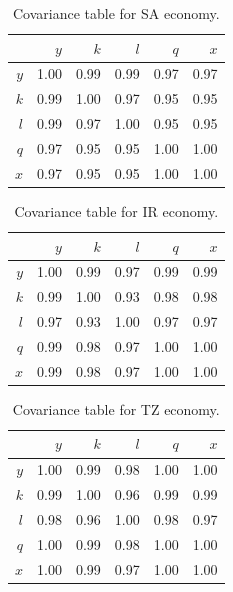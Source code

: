 \documentclass[preprint,authoryear,12pt]{elsarticle}\usepackage{graphicx, color}
\begin{document}
\begin{table}[H]
\begin{center}
\caption{Covariance table for  SA economy.}
\label{tab:Covariance_SA}
\begin{tabular}{rrrrrr}
  \hline
 & $y$ & $k$ & $l$ & $q$ & $x$ \\ 
  \hline
$y$ & 1.00 & 0.99 & 0.99 & 0.97 & 0.97 \\ 
  $k$ & 0.99 & 1.00 & 0.97 & 0.95 & 0.95 \\ 
  $l$ & 0.99 & 0.97 & 1.00 & 0.95 & 0.95 \\ 
  $q$ & 0.97 & 0.95 & 0.95 & 1.00 & 1.00 \\ 
  $x$ & 0.97 & 0.95 & 0.95 & 1.00 & 1.00 \\ 
   \hline
\end{tabular}
\end{center}
\end{table}



\begin{table}[H]
\begin{center}
\caption{Covariance table for  IR economy.}
\label{tab:Covariance_IR}
\begin{tabular}{rrrrrr}
  \hline
 & $y$ & $k$ & $l$ & $q$ & $x$ \\ 
  \hline
$y$ & 1.00 & 0.99 & 0.97 & 0.99 & 0.99 \\ 
  $k$ & 0.99 & 1.00 & 0.93 & 0.98 & 0.98 \\ 
  $l$ & 0.97 & 0.93 & 1.00 & 0.97 & 0.97 \\ 
  $q$ & 0.99 & 0.98 & 0.97 & 1.00 & 1.00 \\ 
  $x$ & 0.99 & 0.98 & 0.97 & 1.00 & 1.00 \\ 
   \hline
\end{tabular}
\end{center}
\end{table}



\begin{table}[H]
\begin{center}
\caption{Covariance table for  TZ economy.}
\label{tab:Covariance_TZ}
\begin{tabular}{rrrrrr}
  \hline
 & $y$ & $k$ & $l$ & $q$ & $x$ \\ 
  \hline
$y$ & 1.00 & 0.99 & 0.98 & 1.00 & 1.00 \\ 
  $k$ & 0.99 & 1.00 & 0.96 & 0.99 & 0.99 \\ 
  $l$ & 0.98 & 0.96 & 1.00 & 0.98 & 0.97 \\ 
  $q$ & 1.00 & 0.99 & 0.98 & 1.00 & 1.00 \\ 
  $x$ & 1.00 & 0.99 & 0.97 & 1.00 & 1.00 \\ 
   \hline
\end{tabular}
\end{center}
\end{table}
\end{document}

